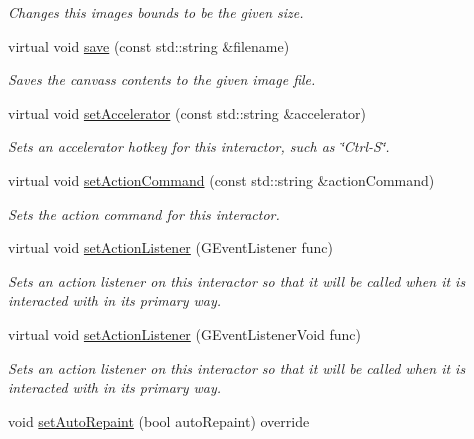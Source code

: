 \begin{DoxyCompactItemize}
\begin{DoxyCompactList}\small\item\em Changes this image\textquotesingle{}s bounds to be the given size. \end{DoxyCompactList}\item 
virtual void \mbox{\hyperlink{classGCanvas_a2c027edbcd25b820dc6e21a9a3ad0496}{save}} (const std\+::string \&filename)
\begin{DoxyCompactList}\small\item\em Saves the canvas\textquotesingle{}s contents to the given image file. \end{DoxyCompactList}\item 
virtual void \mbox{\hyperlink{classGInteractor_ad15f102f62e2960576012f1aa0ba4b2e}{set\+Accelerator}} (const std\+::string \&accelerator)
\begin{DoxyCompactList}\small\item\em Sets an accelerator hotkey for this interactor, such as \char`\"{}\+Ctrl-\/\+S\char`\"{}. \end{DoxyCompactList}\item 
virtual void \mbox{\hyperlink{classGInteractor_a4b5843fe3030e038a1ba54cc03389bcf}{set\+Action\+Command}} (const std\+::string \&action\+Command)
\begin{DoxyCompactList}\small\item\em Sets the action command for this interactor. \end{DoxyCompactList}\item 
virtual void \mbox{\hyperlink{classGInteractor_adcfb4742430c88714fcf57e57ab8ea9c}{set\+Action\+Listener}} (G\+Event\+Listener func)
\begin{DoxyCompactList}\small\item\em Sets an action listener on this interactor so that it will be called when it is interacted with in its primary way. \end{DoxyCompactList}\item 
virtual void \mbox{\hyperlink{classGInteractor_aebd20a89c7a8a43a6fce999cf4f9fcf2}{set\+Action\+Listener}} (G\+Event\+Listener\+Void func)
\begin{DoxyCompactList}\small\item\em Sets an action listener on this interactor so that it will be called when it is interacted with in its primary way. \end{DoxyCompactList}\item 
void \mbox{\hyperlink{classGCanvas_acb65220cc16d17df02a0c08d35b60988}{set\+Auto\+Repaint}} (bool auto\+Repaint) override

\end{DoxyCompactItemize}
